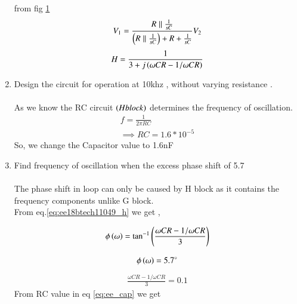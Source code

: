 \begin{enumerate}[label=\arabic*.,ref=\theenumi]
\begin{figure}[!ht]
	\begin{center}
		\resizebox{\columnwidth}{!}{}
	\end{center}
\caption{}
\label{fig:ee18btech11049_h_block}
\end{figure}

from fig \ref{fig:ee18btech11049_h_block} 
\begin{align}
    V_1 = \frac{R \parallel \frac{1}{sC}}{\left(R \parallel \frac{1}{sC}\right) + R + \frac{1}{sC}} V_2
\end{align}
\begin{align}
    H = \frac{1}{3+j\brak{\omega CR - 1/\omega CR}}
    \label{eq:ee18btech11049_h}
\end{align}

\item Design the circuit for operation at 10khz , without varying resistance .
\\
\\
\solution  As we know the RC circuit $\left(H block\right)$ determines the frequency of oscillation.
\begin{align}
    f = \frac{1}{2\pi RC}\\
    \implies RC = 1.6 * 10^{-5}
    \label{eq:ee_cap}
\end{align}
So, we change the Capacitor value to 1.6nF \\




\item Find frequency of oscillation when the excess phase shift  of 5.7\degree
\\ \\
\solution  The phase shift in loop can only be caused by H block as it contains the frequency components unlike G block. \\
From eq.\ref{eq:ee18btech11049_h} we get ,



\begin{align}
\label{eq:ee18btech11049_loop_phase}
    \phi\brak{\omega} = \tan^{-1}\brak{\frac{\omega CR - 1/\omega CR}{3}}
\end{align}

\begin{align}
    \phi\left(\omega\right) = 5.7 \degree 
\end{align}
\begin{align}
    \frac{\omega CR - 1/\omega CR}{3} = 0.1
\end{align}
%
From RC value in eq \ref{eq:ee_cap} we get


\end{enumerate}
